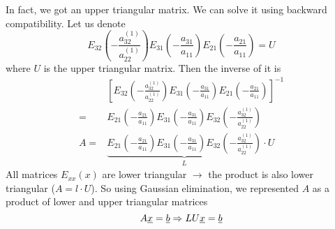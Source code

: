 \begin{example}
In fact, we got an upper triangular matrix. We can solve it using backward compatibility. Let us denote 
\[
E_{32}\left( -\frac{a_{32}^{(1)}}{a_{22}^{(1)}}\right)E_{31}\left( -\frac{a_{31}}{a_{11}}\right)E_{21}\left( -\frac{a_{21}}{a_{11}}\right) = U
\]
where $U$ is the upper triangular matrix. Then the inverse of it is
\begin{align*}
&\left[ E_{32}\left( -\frac{a_{32}^{(1)}}{a_{22}^{(1)}}\right)E_{31}\left( -\frac{a_{31}}{a_{11}}\right)E_{21}\left( -\frac{a_{21}}{a_{11}}\right) \right]^{-1}\\
=& E_{21}\left( -\frac{a_{21}}{a_{11}}\right) E_{31}\left( -\frac{a_{31}}{a_{11}}\right)E_{32}\left( -\frac{a_{32}^{(1)}}{a_{22}^{(1)}}\right)\\
A=& \underbrace{E_{21}\left( -\frac{a_{21}}{a_{11}}\right) E_{31}\left( -\frac{a_{31}}{a_{11}}\right)E_{32}\left( -\frac{a_{32}^{(1)}}{a_{22}^{(1)}}\right)}_{L}\cdot U
\end{align*}
All matrices $E_{xx}(x)$ are lower triangular $\to$ the product is also lower triangular ($A = l\cdot U$). So using Gaussian elimination, we represented $A$ as a product of lower and upper triangular matrices
\[
A\underline{x} = \underline{b} \Rightarrow LU\underline{x} = \underline{b}
\]
\end{example}

